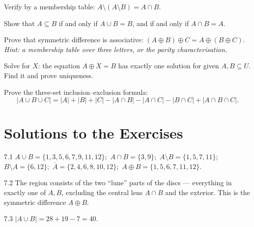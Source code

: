 \begin{exercise}{\medium}
Verify by a membership table:
$A \setminus (A \setminus B) = A \cap B$.
\end{exercise}

\begin{exercise}{\medium}
Show that $A \subseteq B$ if and only if $A \cup B = B$, and if and only if
$A \cap B = A$.
\end{exercise}

\begin{exercise}{\hard}
Prove that symmetric difference is associative:
$(A \oplus B) \oplus C = A \oplus (B \oplus C)$.
\emph{Hint: a membership table over three letters, or the parity
characterisation.}
\end{exercise}

\begin{exercise}{\hard}
Solve for $X$: the equation $A \oplus X = B$ has exactly one solution for
given $A, B \subseteq U$. Find it and prove uniqueness.
\end{exercise}

\begin{exercise}{\hard}
Prove the three-set inclusion--exclusion formula:
\[
|A \cup B \cup C| = |A|+|B|+|C| - |A\cap B| - |A\cap C| - |B\cap C|
+ |A\cap B\cap C|.
\]
\end{exercise}

\section*{Solutions to the Exercises}

\begin{solution}{7.1}
$A \cup B = \{1,3,5,6,7,9,11,12\}$;\
$A \cap B = \{3,9\}$;\
$A \setminus B = \{1,5,7,11\}$;\
$B \setminus A = \{6,12\}$;\
$\overline{A} = \{2,4,6,8,10,12\}$;\
$A \oplus B = \{1,5,6,7,11,12\}$.
\end{solution}

\begin{solution}{7.2}
The region consists of the two ``lune'' parts of the discs --- everything in
exactly one of $A, B$, excluding the central lens $A \cap B$ and the
exterior. This is the symmetric difference $A \oplus B$.
\end{solution}

\begin{solution}{7.3}
$|A \cup B| = 28 + 19 - 7 = 40$.
\end{solution}

